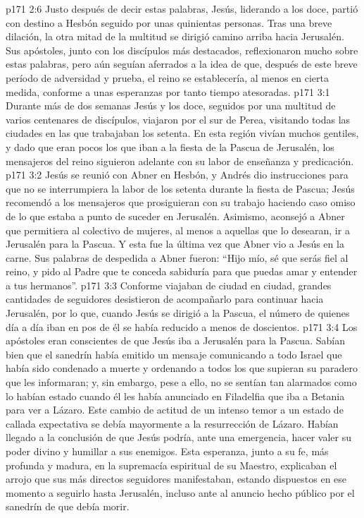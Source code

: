 \vs p171 2:6 \pc Justo después de decir estas palabras, Jesús, liderando a los doce, partió con destino a Hesbón seguido por unas quinientas personas. Tras una breve dilación, la otra mitad de la multitud se dirigió camino arriba hacia Jerusalén. Sus apóstoles, junto con los discípulos más destacados, reflexionaron mucho sobre estas palabras, pero aún seguían aferrados a la idea de que, después de este breve período de adversidad y prueba, el reino se establecería, al menos en cierta medida, conforme a unas esperanzas por tanto tiempo atesoradas.
\vs p171 3:1 Durante más de dos semanas Jesús y los doce, seguidos por una multitud de varios centenares de discípulos, viajaron por el sur de Perea, visitando todas las ciudades en las que trabajaban los setenta. En esta región vivían muchos gentiles, y dado que eran pocos los que iban a la fiesta de la Pascua de Jerusalén, los mensajeros del reino siguieron adelante con su labor de enseñanza y predicación.
\vs p171 3:2 Jesús se reunió con Abner en Hesbón, y Andrés dio instrucciones para que no se interrumpiera la labor de los setenta durante la fiesta de Pascua; Jesús recomendó a los mensajeros que prosiguieran con su trabajo haciendo caso omiso de lo que estaba a punto de suceder en Jerusalén. Asimismo, aconsejó a Abner que permitiera al colectivo de mujeres, al menos a aquellas que lo desearan, ir a Jerusalén para la Pascua. Y esta fue la última vez que Abner vio a Jesús en la carne. Sus palabras de despedida a Abner fueron: “Hijo mío, sé que serás fiel al reino, y pido al Padre que te conceda sabiduría para que puedas amar y entender a tus hermanos”.
\vs p171 3:3 Conforme viajaban de ciudad en ciudad, grandes cantidades de seguidores desistieron de acompañarlo para continuar hacia Jerusalén, por lo que, cuando Jesús se dirigió a la Pascua, el número de quienes día a día iban en pos de él se había reducido a menos de doscientos.
\vs p171 3:4 Los apóstoles eran conscientes de que Jesús iba a Jerusalén para la Pascua. Sabían bien que el sanedrín había emitido un mensaje comunicando a todo Israel que había sido condenado a muerte y ordenando a todos los que supieran su paradero que les informaran; y, sin embargo, pese a ello, no se sentían tan alarmados como lo habían estado cuando él les había anunciado en Filadelfia que iba a Betania para ver a Lázaro. Este cambio de actitud de un intenso temor a un estado de callada expectativa se debía mayormente a la resurrección de Lázaro. Habían llegado a la conclusión de que Jesús podría, ante una emergencia, hacer valer su poder divino y humillar a sus enemigos. Esta esperanza, junto a su fe, más profunda y madura, en la supremacía espiritual de su Maestro, explicaban el arrojo que sus más directos seguidores manifestaban, estando dispuestos en ese momento a seguirlo hasta Jerusalén, incluso ante al anuncio hecho público por el sanedrín de que debía morir.
